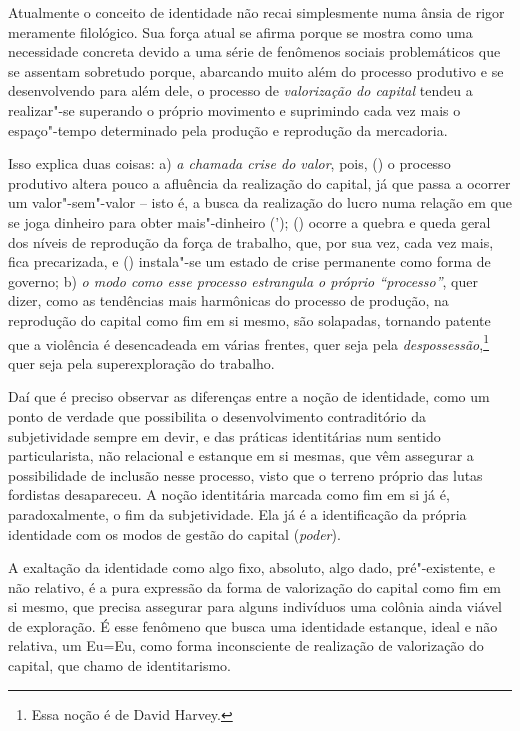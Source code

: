 Atualmente o conceito de
identidade não recai simplesmente numa ânsia de rigor meramente
filológico. Sua força atual se afirma porque se mostra como uma
necessidade concreta devido a uma série de fenômenos sociais
problemáticos que se assentam sobretudo porque, abarcando muito além do
processo produtivo e se desenvolvendo para além dele, o processo de
\emph{valorização do capital} tendeu a realizar"-se superando o próprio
movimento e suprimindo cada vez mais o espaço"-tempo determinado pela
produção e reprodução da mercadoria.

Isso explica duas coisas:
a) \emph{a chamada crise
do valor}, pois, () o processo produtivo altera pouco a
afluência da realização do capital, já que passa a ocorrer um
valor"-sem"-valor -- isto é, a busca da realização do lucro numa relação
em que se joga dinheiro para obter mais"-dinheiro ('); ()
ocorre a quebra e queda geral dos níveis de reprodução da força de
trabalho, que, por sua vez, cada vez mais, fica precarizada, e
() instala"-se um estado de crise permanente como forma de
governo; b) \emph{o modo como esse processo estrangula o próprio
``processo''}, quer dizer, como as tendências mais harmônicas do
processo de produção, na reprodução do capital como fim em si mesmo, são
solapadas, tornando patente que a violência é desencadeada em várias
frentes, quer seja pela
\emph{despossessão},\footnote{Essa
  noção é de David Harvey.} quer seja pela superexploração do trabalho.

Daí que é preciso observar as
diferenças entre a noção de identidade, como um ponto de verdade que
possibilita o desenvolvimento contraditório da subjetividade sempre em
devir, e das práticas identitárias num sentido particularista, não
relacional e estanque em si mesmas, que vêm assegurar a possibilidade de
inclusão nesse processo, visto que o terreno próprio das lutas fordistas
desapareceu. A noção identitária marcada como fim em si já é,
paradoxalmente, o fim da subjetividade. Ela já é a identificação da
própria identidade com os modos de gestão do capital (\emph{poder}).

A exaltação da identidade como algo fixo, absoluto, algo dado,
pré"-existente, e não relativo, é a pura expressão da forma de
valorização do capital como fim em si mesmo, que precisa assegurar para
alguns indivíduos uma colônia ainda viável de exploração. É esse
fenômeno que busca uma identidade estanque, ideal e não relativa, um
Eu=Eu, como forma inconsciente de realização de valorização do capital,
que chamo de identitarismo.

